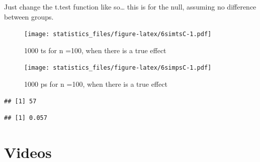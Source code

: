\documentclass[]{book}
\newenvironment{Shaded}{\begin{snugshade}}{\end{snugshade}}
\newcommand{\ControlFlowTok}[1]{\textcolor[rgb]{0.13,0.29,0.53}{\textbf{#1}}}
\newcommand{\DataTypeTok}[1]{\textcolor[rgb]{0.13,0.29,0.53}{#1}}
\newcommand{\DecValTok}[1]{\textcolor[rgb]{0.00,0.00,0.81}{#1}}
\newcommand{\KeywordTok}[1]{\textcolor[rgb]{0.13,0.29,0.53}{\textbf{#1}}}
\newcommand{\NormalTok}[1]{#1}
\newcommand{\OperatorTok}[1]{\textcolor[rgb]{0.81,0.36,0.00}{\textbf{#1}}}
\newcommand{\OtherTok}[1]{\textcolor[rgb]{0.56,0.35,0.01}{#1}}
\newcommand{\StringTok}[1]{\textcolor[rgb]{0.31,0.60,0.02}{#1}}
\begin{document}
Just change the t.test function like so\ldots{} this is for the null, assuming no difference between groups.

\begin{Shaded}
\end{Shaded}

\begin{figure}
\centering
\texttt{[image: statistics\_files/figure-latex/6simtsC-1.pdf]}
\caption{\label{fig:6simtsC}1000 ts for n =100, when there is a true effect}
\end{figure}

\begin{figure}
\centering
\texttt{[image: statistics\_files/figure-latex/6simpsC-1.pdf]}
\caption{\label{fig:6simpsC}1000 ps for n =100, when there is a true effect}
\end{figure}

\begin{verbatim}
## [1] 57
\end{verbatim}

\begin{verbatim}
## [1] 0.057
\end{verbatim}

\hypertarget{videos}{%
\section{Videos}\label{videos}}
\end{document}
